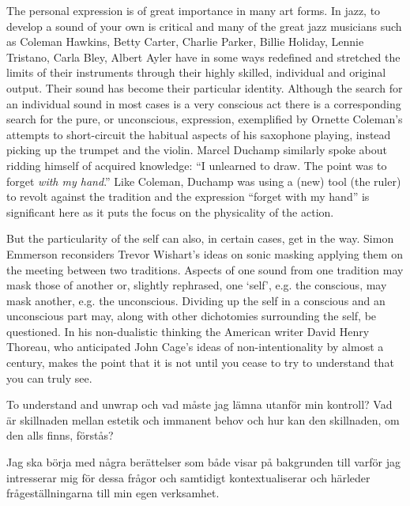 \documentclass[a4paper]{article}
\begin{document}
The personal expression is of great importance in many art forms. In jazz, to develop a sound of your own is critical and many of the great jazz musicians such as Coleman Hawkins, Betty Carter, Charlie Parker, Billie Holiday, Lennie Tristano, Carla Bley, Albert Ayler have in some ways redefined and stretched the limits of their instruments through their highly skilled, individual and original output. Their sound has become their particular identity. Although the search for an individual sound in most cases is a very conscious act there is a corresponding search for the pure, or unconscious, expression, exemplified by Ornette Coleman's attempts to short-circuit the habitual aspects of his saxophone playing, instead picking up the trumpet and the violin. Marcel Duchamp similarly spoke about ridding himself of acquired knowledge: ``I unlearned to draw. The  point was to forget \emph{with my hand}.'' 
Like Coleman, Duchamp was using a (new) tool (the ruler) to revolt against the tradition and the expression ``forget with my hand'' is significant here as it puts the focus on the physicality of the action.

But the particularity of the self can also, in certain cases, get in the way. Simon Emmerson reconsiders Trevor Wishart's ideas on sonic masking applying them on the meeting between two traditions. Aspects of one sound from one tradition may mask those of another or, slightly rephrased, one `self', e.g. the conscious, may mask another, e.g. the unconscious. Dividing up the self in a conscious and an unconscious part may, along with other dichotomies surrounding the self, be questioned. In his non-dualistic thinking the American writer David Henry Thoreau, who anticipated John Cage's ideas of non-intentionality by almost a century, makes the point that it is not until you cease to try to understand that you can truly see.
 
To understand and unwrap och vad måste jag lämna utanför min kontroll? Vad är skillnaden mellan estetik och immanent behov och hur kan den skillnaden, om den alls finns, förstås?

Jag ska börja med några berättelser som både visar på bakgrunden till varför jag intresserar mig för dessa frågor och samtidigt kontextualiserar och härleder frågeställningarna till min egen verksamhet.
\end{document}
